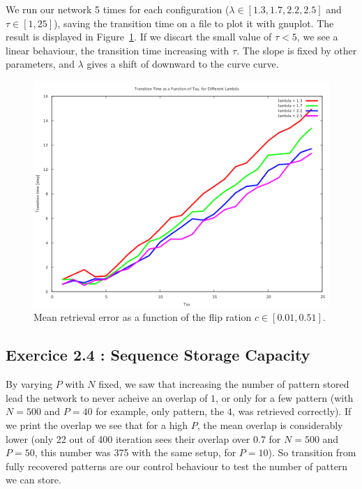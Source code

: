 We run our network 5 times for each configuration ($\lambda \in [1.3, 1.7, 2.2, 2.5]$ and 
$\tau \in [1, 25]$), saving the transition time on a file to plot it with gnuplot. The result
is displayed in Figure~\ref{transtime}. If we discart the small value of $\tau < 5$, we
see a linear behaviour, the transition time increasing with $\tau$. The slope is fixed by other parameters,
and $\lambda$ gives a shift of downward to the curve curve.
\begin{center}
    \begin{figure}\label{transtime}
    \caption{Mean retrieval error as a function of the flip ration $c\in[0.01, 0.51]$.  }
    \includegraphics[scale=0.5]{img/ex23.png}
    \end{figure}
\end{center}

\subsection{Exercice 2.4 : Sequence Storage Capacity}

By varying $P$ with $N$ fixed, we saw that increasing the number of pattern stored lead the network
to never acheive an overlap of $1$, or only for a few pattern (with $N = 500$ and $P = 40$ for example, only pattern, the $4$,
was retrieved correctly). If we print the overlap we see that for a high $P$, the mean overlap is considerably lower (only 22 out of 400
iteration sees their overlap over $0.7$ for $N = 500$ and $P = 50$, this number was 375 with the same setup, for $P = 10$). So transition
from fully recovered patterns are our control behaviour to test the number of pattern we can store. 

